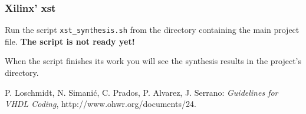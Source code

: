 \documentclass[a4paper,10pt]{article}
\begin{document}
\subsubsection{Xilinx' xst}
Run the script \verb!xst_synthesis.sh! from the directory containing the main project file.  \textbf{The script is not ready yet!}
\vspace{1cm}

\noindent When the script finishes its work you will see the synthesis results in the project's directory.

\begin{thebibliography}{9}%
P. Loschmidt, N. Simanić, C. Prados,
P. Alvarez, J. Serrano: \emph{Guidelines for VHDL Coding},
http://www.ohwr.org/documents/24.
\end{thebibliography}
\end{document}
